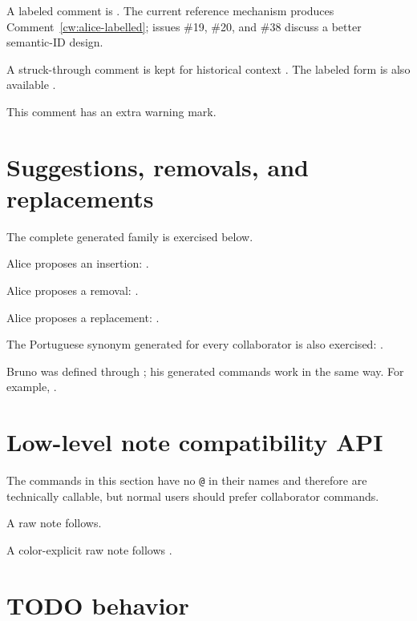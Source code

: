 \documentclass[11pt]{article}
\begin{document}
A labeled comment is
.
The current reference mechanism produces Comment~\ref{cw:alice-labelled};
issues \#19, \#20, and \#38 discuss a better semantic-ID design.

A struck-through comment is kept for historical context
.
The labeled form is also available
.

\cwsetcommwarn{!}
This comment has an extra warning mark.
\cwsetcommwarn{}

\section{Suggestions, removals, and replacements}

The complete generated family is exercised below.

Alice proposes an insertion: .

Alice proposes a removal:
.

Alice proposes a replacement:
.

The Portuguese synonym generated for every collaborator is also exercised:
.

Bruno was defined through \texttt{\string\cwautor}; his generated commands
work in the same way. For example,
.

\section{Low-level note compatibility API}

The commands in this section have no \texttt{@} in their names and therefore
are technically callable, but normal users should prefer collaborator commands.

A raw note follows.

A color-explicit raw note follows
.

\section{TODO behavior}
\end{document}
